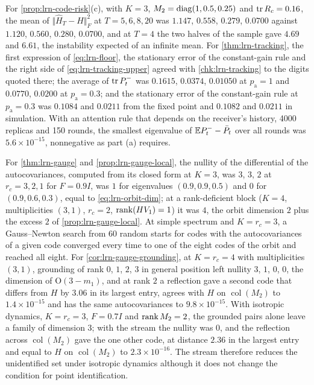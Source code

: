 \begin{numcheck}
For \cref{prop:lrn-code-risk}(c), with $K=3$, $M_2=\operatorname{diag}(1,0.5,0.25)$ and $\operatorname{tr} R_c=0.16$, the mean of $\Vert\hat H_T-H\Vert_F^2$ at $T=5,6,8,20$ was $1.147$, $0.558$, $0.279$, $0.0700$ against $1.120$, $0.560$, $0.280$, $0.0700$, and at $T=4$ the two halves of the sample gave $4.69$ and $6.61$, the instability expected of an infinite mean. For \cref{thm:lrn-tracking}, the first expression of \cref{eq:lrn-floor}, the stationary error of the constant-gain rule and the right side of \cref{eq:lrn-tracking-upper} agreed with \cref{chk:lrn-tracking} to the digits quoted there; the average of $\operatorname{tr} P^-_t$ was $0.1615$, $0.0374$, $0.01050$ at $p_{\mathrm a}=1$ and $0.0770$, $0.0200$ at $p_{\mathrm a}=0.3$; and the stationary error of the constant-gain rule at $p_{\mathrm a}=0.3$ was $0.1084$ and $0.0211$ from the fixed point and $0.1082$ and $0.0211$ in simulation. With an attention rule that depends on the receiver's history, 4000 replicas and 150 rounds, the smallest eigenvalue of $\mathbb{E} P^-_t-\bar P_t$ over all rounds was $5.6\times10^{-15}$, nonnegative as part (a) requires.

For \cref{thm:lrn-gauge} and \cref{prop:lrn-gauge-local}, the nullity of the differential of the autocovariances, computed from its closed form at $K=3$, was $3$, $3$, $2$ at $r_c=3,2,1$ for $F=0.9I$, was $1$ for eigenvalues $(0.9,0.9,0.5)$ and $0$ for $(0.9,0.6,0.3)$, equal to \cref{eq:lrn-orbit-dim}; at a rank-deficient block ($K=4$, multiplicities $(3,1)$, $r_c=2$, $\operatorname{rank}(HV_1)=1$) it was $4$, the orbit dimension $2$ plus the excess $2$ of \cref{prop:lrn-gauge-local}. At simple spectrum and $K=r_c=3$, a Gauss--Newton search from 60 random starts for codes with the autocovariances of a given code converged every time to one of the eight codes of the orbit and reached all eight. For \cref{cor:lrn-gauge-grounding}, at $K=r_c=4$ with multiplicities $(3,1)$, grounding of rank $0$, $1$, $2$, $3$ in general position left nullity $3$, $1$, $0$, $0$, the dimension of $\mathrm O(3-m_1)$, and at rank $2$ a reflection gave a second code that differs from $H$ by $3.06$ in its largest entry, agrees with $H$ on $\operatorname{col}(M_2)$ to $1.4\times10^{-15}$ and has the same autocovariances to $9.8\times10^{-15}$. With isotropic dynamics, $K=r_c=3$, $F=0.7I$ and $\operatorname{rank} M_2=2$, the grounded pairs alone leave a family of dimension $3$; with the stream the nullity was $0$, and the reflection across $\operatorname{col}(M_2)$ gave the one other code, at distance $2.36$ in the largest entry and equal to $H$ on $\operatorname{col}(M_2)$ to $2.3\times10^{-16}$. The stream therefore reduces the unidentified set under isotropic dynamics although it does not change the condition for point identification.


\end{numcheck}
